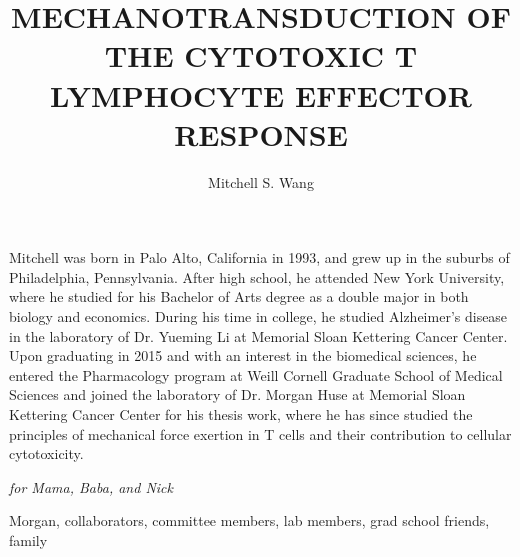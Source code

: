 \documentclass[phd,tocprelim]{cornell}
\title{MECHANOTRANSDUCTION OF THE CYTOTOXIC T LYMPHOCYTE  EFFECTOR RESPONSE}
\author {Mitchell S. Wang}
\begin{document}
\maketitle
\makecopyright

\begin{abstract}

\end{abstract}

\begin{biosketch}
Mitchell was born in Palo Alto, California in 1993, and grew up in the suburbs of Philadelphia, Pennsylvania. After high school, he attended New York University, where he studied for his Bachelor of Arts degree as a double major in both biology and economics. During his time in college, he studied Alzheimer’s disease in the laboratory of Dr. Yueming Li at Memorial Sloan Kettering Cancer Center. Upon graduating in 2015 and with an interest in the biomedical sciences, he entered the Pharmacology program at Weill Cornell Graduate School of Medical Sciences and joined the laboratory of Dr. Morgan Huse at Memorial Sloan Kettering Cancer Center for his thesis work, where he has since studied the principles of mechanical force exertion in T cells and their contribution to cellular cytotoxicity.
\end{biosketch}

\begin{dedication}
\emph{for Mama,  Baba,  and Nick}
\end{dedication}

\begin{acknowledgements}
Morgan, collaborators, committee members, lab members, grad school friends, family
\end{acknowledgements}

\contentspage
\tablelistpage
\figurelistpage

\normalspacing \setcounter{page}{1} 
\pagestyle{cornell} \addtolength{\parskip}{0.5\baselineskip}

\end{document}
